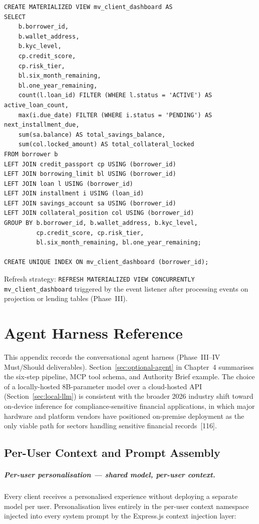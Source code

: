 \documentclass[12pt,a4paper]{report}
\begin{document}
\begin{verbatim}
CREATE MATERIALIZED VIEW mv_client_dashboard AS
SELECT
    b.borrower_id,
    b.wallet_address,
    b.kyc_level,
    cp.credit_score,
    cp.risk_tier,
    bl.six_month_remaining,
    bl.one_year_remaining,
    count(l.loan_id) FILTER (WHERE l.status = 'ACTIVE') AS active_loan_count,
    max(i.due_date) FILTER (WHERE i.status = 'PENDING') AS next_installment_due,
    sum(sa.balance) AS total_savings_balance,
    sum(col.locked_amount) AS total_collateral_locked
FROM borrower b
LEFT JOIN credit_passport cp USING (borrower_id)
LEFT JOIN borrowing_limit bl USING (borrower_id)
LEFT JOIN loan l USING (borrower_id)
LEFT JOIN installment i USING (loan_id)
LEFT JOIN savings_account sa USING (borrower_id)
LEFT JOIN collateral_position col USING (borrower_id)
GROUP BY b.borrower_id, b.wallet_address, b.kyc_level,
         cp.credit_score, cp.risk_tier,
         bl.six_month_remaining, bl.one_year_remaining;

CREATE UNIQUE INDEX ON mv_client_dashboard (borrower_id);
\end{verbatim}

\noindent Refresh strategy: \texttt{REFRESH MATERIALIZED VIEW CONCURRENTLY mv\_client\_dashboard} triggered by the event listener after processing events on projection or lending tables (Phase~III).

\chapter{Agent Harness Reference}
\label{app:agent-harness}

This appendix records the conversational agent harness (Phase~III--IV Must/Should deliverables). Section~\ref{sec:optional-agent} in Chapter~4 summarises the six-step pipeline, MCP tool schema, and Authority Brief example.
The choice of a locally-hosted 8B-parameter model over a cloud-hosted
API (Section~\ref{sec:local-llm}) is consistent with the broader 2026
industry shift toward on-device inference for compliance-sensitive
financial applications, in which major hardware and platform vendors
have positioned on-premise deployment as the only viable path for
sectors handling sensitive financial records~[116].

\section{Per-User Context and Prompt Assembly}

\paragraph{Per-user personalisation --- shared model, per-user context.}
Every client receives a personalised experience without deploying a separate model per user. Personalisation lives entirely in the per-user context namespace injected into every system prompt by the Express.js context injection layer:
\end{document}
